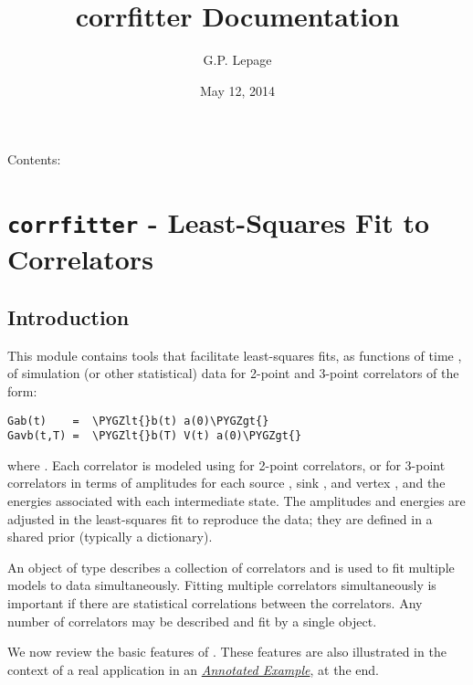 \documentclass[letterpaper,10pt,english]{sphinxmanual}
\title{corrfitter Documentation}
\date{May 12, 2014}
\author{G.P. Lepage}
\def\PYGZlt{\char`\<}
\def\PYGZgt{\char`\>}
\begin{document}
\maketitle
\tableofcontents
{}\label{index::doc}


Contents:


\chapter{\texttt{corrfitter} - Least-Squares Fit to Correlators}
\label{corrfitter:corrfitter-documentation}\label{corrfitter::doc}\label{corrfitter:corrfitter-least-squares-fit-to-correlators}

\section{Introduction}
\label{corrfitter:introduction}
This module contains tools that facilitate least-squares fits, as functions
of time , of simulation (or other statistical) data for 2-point and
3-point correlators of the form:

\begin{Verbatim}[commandchars=\\\{\}]
Gab(t)    =  \PYGZlt{}b(t) a(0)\PYGZgt{}
Gavb(t,T) =  \PYGZlt{}b(T) V(t) a(0)\PYGZgt{}
\end{Verbatim}

where . Each correlator is modeled using {\hyperref[corrfitter:corrfitter.Corr2]{}} for 2-point
correlators, or {\hyperref[corrfitter:corrfitter.Corr3]{}} for 3-point correlators in terms of amplitudes for
each source , sink , and vertex , and the energies
associated with each intermediate state. The amplitudes and energies are
adjusted in the least-squares fit to reproduce the data; they are defined
in a shared prior (typically a dictionary).

An object of type {\hyperref[corrfitter:corrfitter.CorrFitter]{}} describes a collection of correlators and is
used to fit multiple models to data simultaneously. Fitting multiple
correlators simultaneously is important if there are statistical
correlations between the correlators. Any number of correlators may be
described and fit by a single {\hyperref[corrfitter:corrfitter.CorrFitter]{}} object.

We now review the basic features of . These features are also
illustrated in the context of a real application in an
{\hyperref[corrfitter:annotated-example]{\emph{Annotated Example}}}, at the end.
\end{document}
